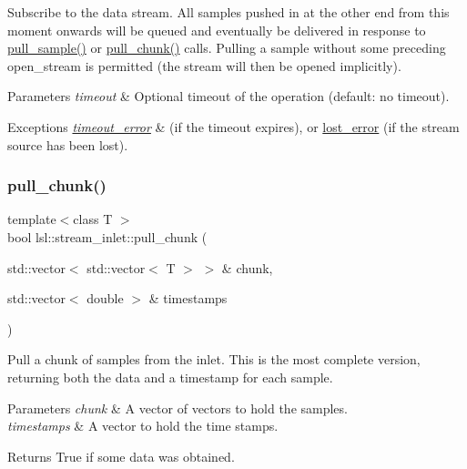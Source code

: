 Subscribe to the data stream. All samples pushed in at the other end from this moment onwards will be queued and eventually be delivered in response to \hyperlink{classlsl_1_1stream__inlet_a58dc91be6ec0d1b83024a169ad0c292b}{pull\+\_\+sample()} or \hyperlink{classlsl_1_1stream__inlet_a558f53812f5dc3c19b2cbe0026a61f6a}{pull\+\_\+chunk()} calls. Pulling a sample without some preceding open\+\_\+stream is permitted (the stream will then be opened implicitly). 
\begin{DoxyParams}{Parameters}
{\em timeout} & Optional timeout of the operation (default\+: no timeout). \\
\hline
\end{DoxyParams}

\begin{DoxyExceptions}{Exceptions}
{\em \hyperlink{classlsl_1_1timeout__error}{timeout\+\_\+error}} & (if the timeout expires), or \hyperlink{classlsl_1_1lost__error}{lost\+\_\+error} (if the stream source has been lost). \\
\hline
\end{DoxyExceptions}
\mbox{\label{classlsl_1_1stream__inlet_af9051121db6ffa6945bd2288b2bf2a15}} 
\subsubsection{\texorpdfstring{pull\+\_\+chunk()}{pull\_chunk()}\hspace{0.1cm}{\footnotesize\ttfamily [1/3]}}
{\footnotesize\ttfamily template$<$class T $>$ \\
bool lsl\+::stream\+\_\+inlet\+::pull\+\_\+chunk (\begin{DoxyParamCaption}\item[{std\+::vector$<$ std\+::vector$<$ T $>$ $>$ \&}]{chunk,  }\item[{std\+::vector$<$ double $>$ \&}]{timestamps }\end{DoxyParamCaption})\hspace{0.3cm}{\ttfamily [inline]}}

Pull a chunk of samples from the inlet. This is the most complete version, returning both the data and a timestamp for each sample. 
\begin{DoxyParams}{Parameters}
{\em chunk} & A vector of vectors to hold the samples. \\
\hline
{\em timestamps} & A vector to hold the time stamps. \\
\hline
\end{DoxyParams}
\begin{DoxyReturn}{Returns}
True if some data was obtained. 
\end{DoxyReturn}

